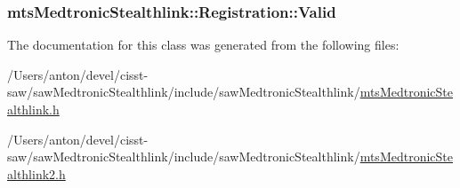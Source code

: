\subsubsection[{Valid}]{ mts\+Medtronic\+Stealthlink\+::\+Registration\+::\+Valid}\label{classmts_medtronic_stealthlink_1_1_registration_a1d7ccec8ab8b0fd47b0650496d328dfb}


The documentation for this class was generated from the following files\+:\begin{DoxyCompactItemize}
\item 
/\+Users/anton/devel/cisst-\/saw/saw\+Medtronic\+Stealthlink/include/saw\+Medtronic\+Stealthlink/\hyperlink{mts_medtronic_stealthlink_8h}{mts\+Medtronic\+Stealthlink.\+h}\item 
/\+Users/anton/devel/cisst-\/saw/saw\+Medtronic\+Stealthlink/include/saw\+Medtronic\+Stealthlink/\hyperlink{mts_medtronic_stealthlink2_8h}{mts\+Medtronic\+Stealthlink2.\+h}\end{DoxyCompactItemize}
